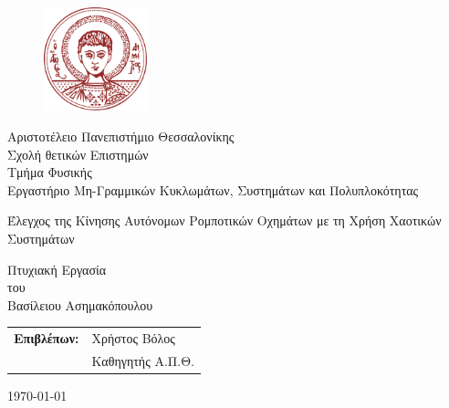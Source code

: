 \begin{titlepage}
	
\begin{figure}[H]
		\begin{center}
			\includegraphics[width=3cm]{LateX images/auth}
			\label{fig:cover_auth_logo}
		\end{center}
	\end{figure}
	
	\centering
	\Large Αριστοτέλειο Πανεπιστήμιο Θεσσαλονίκης\\
	\Large Σχολή θετικών Επιστημών\\
	\large Τμήμα Φυσικής\\
	\large Εργαστήριο Μη-Γραμμικών Κυκλωμάτων, Συστημάτων και Πολυπλοκότητας
	
	\vspace{\fill}
	
	\LARGE Έλεγχος  της  Κίνησης  Αυτόνομων  Ρομποτικών  Οχημάτων  με  τη   Χρήση Χαοτικών Συστημάτων
	
	\vspace{\fill}
	
	\Large Πτυχιακή Εργασία\\
	\Large του\\
	\Large Βασίλειου Ασημακόπουλου
	
	\vspace{\fill}
	\raggedright
	
	\begin{tabular}{ll}
		\textbf{Επιβλέπων:} & Χρήστος Βόλος\\
		& Καθηγητής Α.Π.Θ.\\
	\end{tabular}
	
	\centering
	\vspace{\fill}
	\today
	
\end{titlepage}

